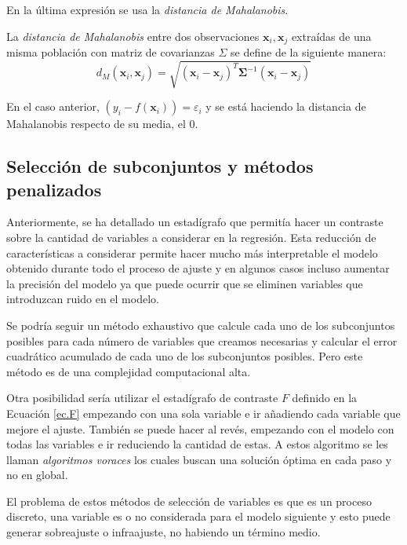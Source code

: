 \noindent En la última expresión se usa la \textit{distancia de Mahalanobis}.
\begin{defi}
La \textit{distancia de Mahalanobis} entre dos observaciones $\textbf{x}_i, \textbf{x}_j$ extraídas de una misma población con matriz de covarianzas $\Sigma$ se define de la siguiente manera\cite{Cuadras 2014}: 
\begin{equation}
d_M(\textbf{x}_i, \textbf{x}_j)=\sqrt{(\textbf{x}_i- \textbf{x}_j)^T \mathbf{\Sigma}^{-1}(\textbf{x}_i-\textbf{x}_j)}
\end{equation}
\end{defi}

\noindent En el caso anterior, $(y_i-f(\textbf{x}_i))=\varepsilon_i$ y se está haciendo la distancia de Mahalanobis respecto de su media, el 0. 


\subsection*{Selección de subconjuntos y métodos penalizados}

\noindent Anteriormente, se ha detallado un estadígrafo que permitía hacer un contraste sobre la cantidad de variables a considerar en la regresión. 
Esta reducción de características a considerar permite hacer mucho más interpretable el modelo obtenido durante todo el proceso de ajuste y en algunos casos incluso aumentar la precisión del modelo ya que puede ocurrir que se eliminen variables que introduzcan ruido en el modelo. 

\noindent Se podría seguir un método exhaustivo que calcule cada uno de los subconjuntos posibles para cada número de variables que creamos necesarias y calcular el error cuadrático acumulado de cada uno de los subconjuntos posibles. Pero este método es de una complejidad computacional alta. 

\noindent Otra posibilidad sería utilizar el estadígrafo de contraste $F$ definido en la Ecuación \eqref{ec.F} empezando con una sola variable e ir añadiendo cada variable que mejore el ajuste. También se puede hacer al revés, empezando con el modelo con todas las variables e ir reduciendo la cantidad de estas. A estos algoritmo se les llaman \emph{algoritmos voraces} los cuales buscan una solución óptima en cada paso y no en global. 

\noindent El problema de estos métodos de selección de variables es que es un proceso discreto, una variable es o no considerada para el modelo siguiente y esto puede generar sobreajuste o infraajuste, no habiendo un término medio. 


